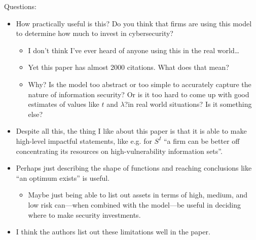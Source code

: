 \documentclass[11pt]{article}
\begin{document}
Questions:
\begin{itemize}
    \item How practically useful is this? Do you think that firms are using this model to determine how much to invest in cybersecurity?
    \begin{itemize}
        \item I don't think I've ever heard of anyone using this in the real world\dots
        \item Yet this paper has almost 2000 citations. What does that mean?
        \item Why? Is the model too abstract or too simple to accurately capture the nature of information security? Or is it too hard to come up with good estimates of values like $t$ and $\lambda$?in real world situations? Is it something else?
    \end{itemize}
    \item Despite all this, the thing I like about this paper is that it is able to make high-level impactful statements, like e.g. for $S^I$ ``a firm can be better off concentrating its resources on high-vulnerability information sets''.
    \item Perhaps just describing the shape of functions and reaching conclusions like ``an optimum exists'' is useful. 
    \begin{itemize}
        \item Maybe just being able to list out assets in terms of high, medium, and low risk can---when combined with the model---be useful in deciding where to make security investments.
    \end{itemize}
    \item I think the authors list out these limitations well in the paper.
\end{itemize}
\end{document}
